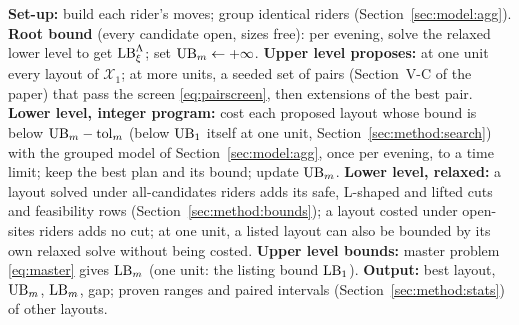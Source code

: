 \begin{algorithm}[t]
\caption{Bilevel siting loop: propose layouts, cost them with the integer program, bound all the others (input: candidate sites, size menu, budget $m$, evenings $\Xi$)}\label{alg:siting}
\scriptsize
\begin{algorithmic}[1]
\STATE \textbf{Set-up:} build each rider's moves; group identical riders (Section~\ref{sec:model:agg}).
\STATE \textbf{Root bound} (every candidate open, sizes free): per evening, solve the relaxed lower level to get $\mathrm{LB}^{\Lambda}_\xi$; set $\mathrm{UB}_m\leftarrow+\infty$.
\REPEAT
\STATE \textbf{Upper level proposes:} at one unit every layout of $\mathcal X_1$; at more units, a seeded set of pairs (Section~V-C of the paper) that pass the screen \eqref{eq:pairscreen}, then extensions of the best pair.
\STATE \textbf{Lower level, integer program:} cost each proposed layout whose bound is below $\mathrm{UB}_m-\mathrm{tol}_m$ (below $\mathrm{UB}_1$ itself at one unit, Section~\ref{sec:method:search}) with the grouped model of Section~\ref{sec:model:agg}, once per evening, to a time limit; keep the best plan and its bound; update $\mathrm{UB}_m$.
\STATE \textbf{Lower level, relaxed:} a layout solved under all-candidates riders adds its safe, L-shaped and lifted cuts and feasibility rows (Section~\ref{sec:method:bounds}); a layout costed under open-sites riders adds no cut; at one unit, a listed layout can also be bounded by its own relaxed solve without being costed.
\STATE \textbf{Upper level bounds:} master problem \eqref{eq:master} gives $\mathrm{LB}_m$ (one unit: the listing bound $\mathrm{LB}_1$).
\STATE \textbf{Output:} best layout, $\mathrm{UB}_m$, $\mathrm{LB}_m$, gap; proven ranges and paired intervals (Section~\ref{sec:method:stats}) of other layouts.
\end{algorithmic}
\end{algorithm}

